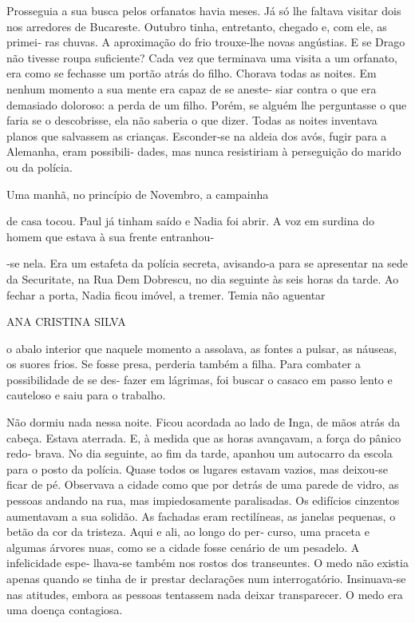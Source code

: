 Prosseguia a sua busca pelos orfanatos havia meses. Já só lhe faltava
visitar dois nos arredores de Bucareste. Outubro tinha, entretanto,
chegado e, com ele, as primei‑ ras chuvas. A aproximação do frio
trouxe‑lhe novas angústias. E se Drago não tivesse roupa suficiente?
Cada vez que terminava uma visita a um orfanato, era como se fechasse um
portão atrás do filho. Chorava todas as noites. Em nenhum momento a sua
mente era capaz de se aneste‑ siar contra o que era demasiado doloroso:
a perda de um filho. Porém, se alguém lhe perguntasse o que faria se o
descobrisse, ela não saberia o que dizer. Todas as noites inventava
planos que salvassem as crianças. Esconder‑se na aldeia dos avós, fugir
para a Alemanha, eram possibili‑ dades, mas nunca resistiriam à
perseguição do marido ou da polícia.

Uma manhã, no princípio de Novembro, a campainha

de casa tocou. Paul já tinham saído e Nadia foi abrir. A voz em surdina
do homem que estava à sua frente entranhou‑

‑se nela. Era um estafeta da polícia secreta, avisando‑a para se
apresentar na sede da Securitate, na Rua Dem Dobrescu, no dia seguinte
às seis horas da tarde. Ao fechar a porta, Nadia ficou imóvel, a tremer.
Temia não aguentar

ANA CRISTINA SILVA

o abalo interior que naquele momento a assolava, as fontes a pulsar, as
náuseas, os suores frios. Se fosse presa, perderia também a filha. Para
combater a possibilidade de se des‑ fazer em lágrimas, foi buscar o
casaco em passo lento e cauteloso e saiu para o trabalho.

Não dormiu nada nessa noite. Ficou acordada ao lado de Inga, de mãos
atrás da cabeça. Estava aterrada. E, à medida que as horas avançavam, a
força do pânico redo‑ brava. No dia seguinte, ao fim da tarde, apanhou
um autocarro da escola para o posto da polícia. Quase todos os lugares
estavam vazios, mas deixou‑se ficar de pé. Observava a cidade como que
por detrás de uma parede de vidro, as pessoas andando na rua, mas
impiedosamente paralisadas. Os edifícios cinzentos aumentavam a sua
solidão. As fachadas eram rectilíneas, as janelas pequenas, o betão da
cor da tristeza. Aqui e ali, ao longo do per‑ curso, uma praceta e
algumas árvores nuas, como se a cidade fosse cenário de um pesadelo. A
infelicidade espe‑ lhava‑se também nos rostos dos transeuntes. O medo
não existia apenas quando se tinha de ir prestar declarações num
interrogatório. Insinuava‑se nas atitudes, embora as pessoas tentassem
nada deixar transparecer. O medo era uma doença contagiosa.

